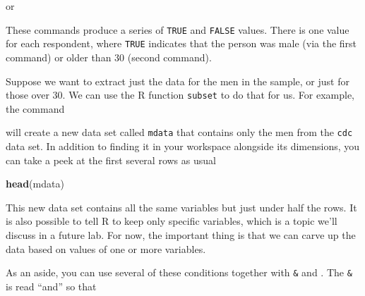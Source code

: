 \documentclass[]{book}
\newenvironment{Shaded}{\begin{snugshade}}{\end{snugshade}}
\newcommand{\KeywordTok}[1]{\textcolor[rgb]{0.13,0.29,0.53}{\textbf{{#1}}}}
\newcommand{\DecValTok}[1]{\textcolor[rgb]{0.00,0.00,0.81}{{#1}}}
\newcommand{\StringTok}[1]{\textcolor[rgb]{0.31,0.60,0.02}{{#1}}}
\newcommand{\NormalTok}[1]{{#1}}
\theoremstyle{definition}
\theoremstyle{definition}
\theoremstyle{definition}
\theoremstyle{remark}
\begin{document}
\begin{Shaded}
\end{Shaded}

or

\begin{Shaded}
\end{Shaded}

These commands produce a series of \texttt{TRUE} and \texttt{FALSE}
values. There is one value for each respondent, where \texttt{TRUE}
indicates that the person was male (via the first command) or older than
30 (second command).

Suppose we want to extract just the data for the men in the sample, or
just for those over 30. We can use the R function \texttt{subset} to do
that for us. For example, the command

\begin{Shaded}
\end{Shaded}

will create a new data set called \texttt{mdata} that contains only the
men from the \texttt{cdc} data set. In addition to finding it in your
workspace alongside its dimensions, you can take a peek at the first
several rows as usual

\begin{Shaded}
\begin{Highlighting}[]
\KeywordTok{head}\NormalTok{(mdata)}
\end{Highlighting}
\end{Shaded}

This new data set contains all the same variables but just under half
the rows. It is also possible to tell R to keep only specific variables,
which is a topic we'll discuss in a future lab. For now, the important
thing is that we can carve up the data based on values of one or more
variables.

As an aside, you can use several of these conditions together with
\texttt{\&} and \texttt{\textbar{}}. The \texttt{\&} is read ``and'' so
that
\end{document}
